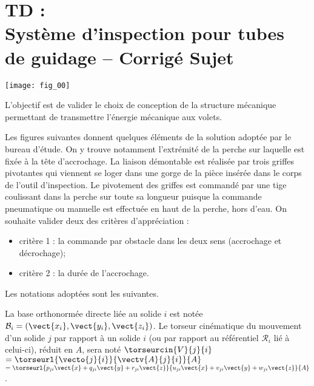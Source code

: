 \chapter*{TD  :\\ 
Système d'inspection pour tubes de guidage -- \ifprof Corrigé \else Sujet \fi}

\iflivret {} \else
\ifprof  {} \else \fi
\fi

\setcounter{question}{0}

\begin{marginfigure}
\texttt{[image: fig\_00]}
\end{marginfigure}



\begin{obj}
L'objectif est de valider le choix de conception de la structure mécanique permettant
de transmettre l'énergie mécanique aux volets.
\end{obj}

Les figures suivantes donnent quelques éléments de la solution adoptée par le bureau d'étude. On y
trouve notamment l'extrémité de la perche sur laquelle est fixée à la tête d'accrochage. La liaison démontable est
réalisée par trois griffes pivotantes qui viennent se loger dans une gorge de la pièce insérée dans le corps de
l'outil d'inspection. Le pivotement des griffes est commandé par une tige coulissant dans la perche sur toute sa
longueur puisque la commande pneumatique ou manuelle est effectuée en haut de la perche, hors d'eau.
On souhaite valider deux des critères d'appréciation :
\begin{itemize}
\item critère 1 : la commande par obstacle dans les deux sens (accrochage et décrochage);
\item critère 2 : la durée de l'accrochage.
\end{itemize}

Les notations adoptées sont les suivantes.

La base orthonormée directe liée au solide $i$  est notée $\mathcal{B}_i = \left(\vect{x_i},\vect{y_i},\vect{z_i}\right)$. Le torseur cinématique du mouvement d’un solide $j$ par rapport à un solide $i$
(ou par rapport au référentiel $\mathcal{R}_i$ lié à celui-ci), réduit en $A$, sera noté $\torseurcin{V}{j}{i}$ $=\torseurl{\vecto{j}{i}}{\vectv{A}{j}{i}}{A}$ $=\torseurl{p_{ji} \vect{x}+q_{ji}\vect{y}+r_{ji}\vect{z}}{u_{ji} \vect{x}+v_{ji}\vect{y}+w_{ji}\vect{z}}{A}$.%

